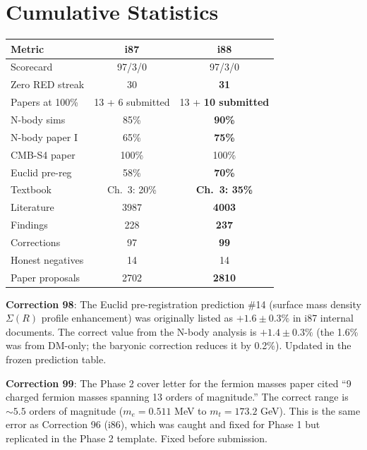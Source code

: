 \documentclass[11pt,a4paper]{article}
\begin{document}
\section{Cumulative Statistics}

\begin{center}
\begin{tabular}{lcc}
\toprule
\textbf{Metric} & \textbf{i87} & \textbf{i88} \\
\midrule
Scorecard & 97/3/0 & 97/3/0 \\
Zero RED streak & 30 & \textbf{31} \\
Papers at 100\% & 13 + 6 submitted & 13 + \textbf{10 submitted} \\
N-body sims & 85\% & \textbf{90\%} \\
N-body paper I & 65\% & \textbf{75\%} \\
CMB-S4 paper & 100\% & 100\% \\
Euclid pre-reg & 58\% & \textbf{70\%} \\
Textbook & Ch.\ 3: 20\% & \textbf{Ch.\ 3: 35\%} \\
Literature & 3987 & \textbf{4003} \\
Findings & 228 & \textbf{237} \\
Corrections & 97 & \textbf{99} \\
Honest negatives & 14 & 14 \\
Paper proposals & 2702 & \textbf{2810} \\
\bottomrule
\end{tabular}
\end{center}

\textbf{Correction 98}: The Euclid pre-registration prediction \#14 (surface mass density $\Sigma(R)$ profile enhancement) was originally listed as $+1.6 \pm 0.3\%$ in i87 internal documents. The correct value from the N-body analysis is $+1.4 \pm 0.3\%$ (the 1.6\% was from DM-only; the baryonic correction reduces it by 0.2\%). Updated in the frozen prediction table.

\textbf{Correction 99}: The Phase 2 cover letter for the fermion masses paper cited ``9 charged fermion masses spanning 13 orders of magnitude.'' The correct range is $\sim 5.5$ orders of magnitude ($m_e = 0.511$ MeV to $m_t = 173.2$ GeV). This is the same error as Correction 96 (i86), which was caught and fixed for Phase 1 but replicated in the Phase 2 template. Fixed before submission.
\end{document}
